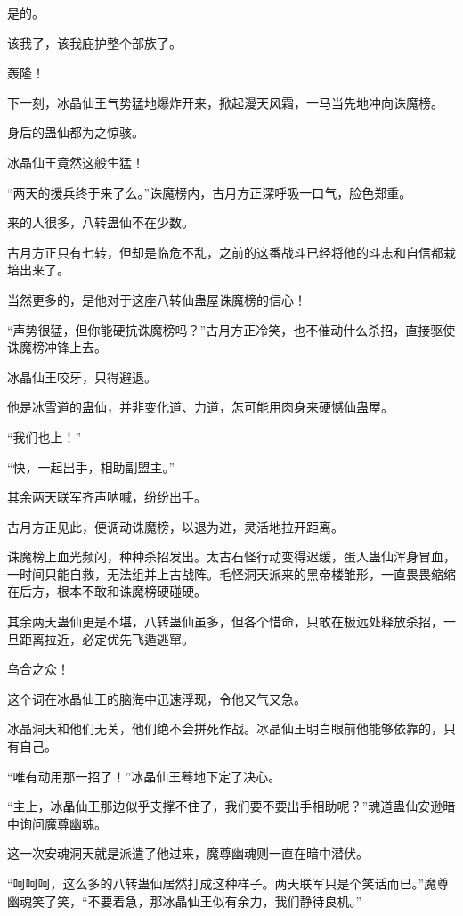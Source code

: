 \begin{this_body}
是的。

该我了，该我庇护整个部族了。

轰隆！

下一刻，冰晶仙王气势猛地爆炸开来，掀起漫天风霜，一马当先地冲向诛魔榜。

身后的蛊仙都为之惊骇。

冰晶仙王竟然这般生猛！

“两天的援兵终于来了么。”诛魔榜内，古月方正深呼吸一口气，脸色郑重。

来的人很多，八转蛊仙不在少数。

古月方正只有七转，但却是临危不乱，之前的这番战斗已经将他的斗志和自信都栽培出来了。

当然更多的，是他对于这座八转仙蛊屋诛魔榜的信心！

“声势很猛，但你能硬抗诛魔榜吗？”古月方正冷笑，也不催动什么杀招，直接驱使诛魔榜冲锋上去。

冰晶仙王咬牙，只得避退。

他是冰雪道的蛊仙，并非变化道、力道，怎可能用肉身来硬憾仙蛊屋。

“我们也上！”

“快，一起出手，相助副盟主。”

其余两天联军齐声呐喊，纷纷出手。

古月方正见此，便调动诛魔榜，以退为进，灵活地拉开距离。

诛魔榜上血光频闪，种种杀招发出。太古石怪行动变得迟缓，蛋人蛊仙浑身冒血，一时间只能自救，无法组并上古战阵。毛怪洞天派来的黑帝楼雏形，一直畏畏缩缩在后方，根本不敢和诛魔榜硬碰硬。

其余两天蛊仙更是不堪，八转蛊仙虽多，但各个惜命，只敢在极远处释放杀招，一旦距离拉近，必定优先飞遁逃窜。

乌合之众！

这个词在冰晶仙王的脑海中迅速浮现，令他又气又急。

冰晶洞天和他们无关，他们绝不会拼死作战。冰晶仙王明白眼前他能够依靠的，只有自己。

“唯有动用那一招了！”冰晶仙王蓦地下定了决心。

“主上，冰晶仙王那边似乎支撑不住了，我们要不要出手相助呢？”魂道蛊仙安逊暗中询问魔尊幽魂。

这一次安魂洞天就是派遣了他过来，魔尊幽魂则一直在暗中潜伏。

“呵呵呵，这么多的八转蛊仙居然打成这种样子。两天联军只是个笑话而已。”魔尊幽魂笑了笑，“不要着急，那冰晶仙王似有余力，我们静待良机。”

\end{this_body}

